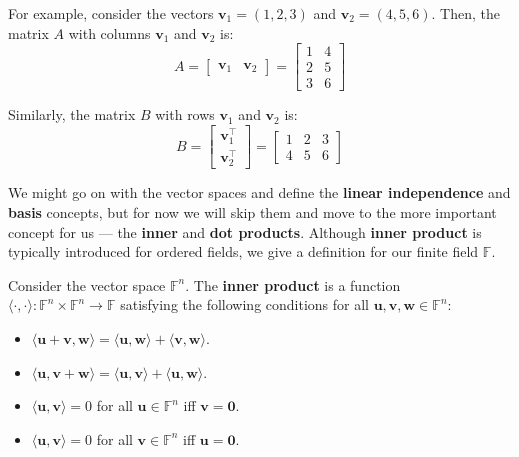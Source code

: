 \documentclass[../lecture-notes.tex]{subfiles}
\begin{document}
\begin{example}
    For example, consider the vectors $\mathbf{v}_1 = (1,2,3)$ and $\mathbf{v}_2 = (4,5,6)$. Then, the matrix $A$ with columns $\mathbf{v}_1$ and $\mathbf{v}_2$ is:
    \begin{equation*}
        A = \begin{bmatrix}
            \mathbf{v}_1 & \mathbf{v}_2
        \end{bmatrix} = \begin{bmatrix}
            1 & 4 \\
            2 & 5 \\
            3 & 6
        \end{bmatrix}
    \end{equation*}

    Similarly, the matrix $B$ with rows $\mathbf{v}_1$ and $\mathbf{v}_2$ is:
    \begin{equation*}
        B = \begin{bmatrix}
            \mathbf{v}_1^{\top} \\ \mathbf{v}_2^{\top}
        \end{bmatrix} = \begin{bmatrix}
            1 & 2 & 3 \\
            4 & 5 & 6
        \end{bmatrix}
    \end{equation*}
\end{example}

We might go on with the vector spaces and define the \textbf{linear independence} and \textbf{basis} concepts, but for now we will skip them and move to the more important concept for us --- the \textbf{inner} and \textbf{dot products}. Although \textbf{inner product} is typically introduced for ordered fields, we give a definition for our finite field $\mathbb{F}$.

\begin{definition}
    Consider the vector space $\mathbb{F}^n$. The \textbf{inner product} is a function $\langle \cdot, \cdot \rangle: \mathbb{F}^n \times \mathbb{F}^n \to \mathbb{F}$ satisfying the following conditions for all $\mathbf{u},\mathbf{v},\mathbf{w} \in \mathbb{F}^n$:
    \begin{itemize}
        \item $\langle \mathbf{u} + \mathbf{v}, \mathbf{w} \rangle = \langle \mathbf{u}, \mathbf{w} \rangle + \langle \mathbf{v}, \mathbf{w} \rangle$.
        \item $\langle \mathbf{u}, \mathbf{v} + \mathbf{w} \rangle = \langle \mathbf{u}, \mathbf{v} \rangle + \langle \mathbf{u}, \mathbf{w} \rangle$.
        \item $\langle \mathbf{u}, \mathbf{v} \rangle = 0$ for all $\mathbf{u} \in \mathbb{F}^n$ iff $\mathbf{v} = \mathbf{0}$.
        \item $\langle \mathbf{u}, \mathbf{v} \rangle = 0$ for all $\mathbf{v} \in \mathbb{F}^n$ iff $\mathbf{u} = \mathbf{0}$.
    \end{itemize}
\end{definition}
\end{document}
